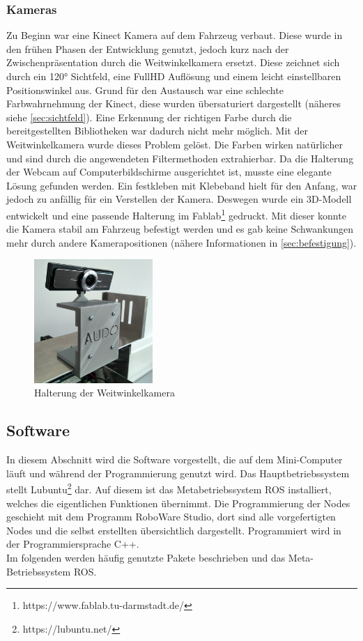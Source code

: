 \subsubsection{Kameras}
\label{sec:kameras}
Zu Beginn war eine Kinect Kamera auf dem Fahrzeug verbaut. Diese wurde in den frühen Phasen der Entwicklung genutzt, jedoch kurz nach der Zwischenpräsentation durch die Weitwinkelkamera ersetzt. Diese zeichnet sich durch ein 120° Sichtfeld, eine FullHD Auflösung und einem leicht einstellbaren Positionswinkel aus.
Grund für den Austausch war eine schlechte Farbwahrnehmung der Kinect, diese wurden übersaturiert dargestellt (näheres siehe \autoref{sec:sichtfeld}). Eine Erkennung der richtigen Farbe durch die bereitgestellten Bibliotheken war dadurch nicht mehr möglich. 
Mit der Weitwinkelkamera wurde dieses Problem gelöst. Die Farben wirken natürlicher und sind durch die angewendeten Filtermethoden extrahierbar. Da die Halterung der Webcam auf Computerbildschirme ausgerichtet ist, musste eine elegante Lösung gefunden werden. Ein festkleben mit Klebeband hielt für den Anfang, war jedoch zu anfällig für ein Verstellen der Kamera.
Deswegen  wurde ein 3D-Modell entwickelt und eine passende Halterung im Fablab\footnote{https://www.fablab.tu-darmstadt.de/} gedruckt. Mit dieser konnte die Kamera stabil am Fahrzeug befestigt werden und es gab keine Schwankungen mehr durch andere Kamerapositionen (nähere Informationen in \autoref{sec:befestigung}). 
\begin{figure}
	\centering
	\includegraphics[width=0.4\textwidth]{images/Foto_Halterung.jpg}
	\caption{Halterung der Weitwinkelkamera}
	\label{abb:halterung}
\end{figure}
\subsection{Software}
\label{sec:software}
In diesem Abschnitt wird die Software vorgestellt, die auf dem Mini-Computer läuft und während der Programmierung genutzt wird. Das Hauptbetriebssystem stellt Lubuntu\footnote{https://lubuntu.net/} dar. Auf diesem ist das Metabetriebssystem ROS installiert, welches die eigentlichen Funktionen übernimmt. Die Programmierung der Nodes geschieht mit dem Programm RoboWare Studio, dort sind alle vorgefertigten Nodes und die selbst erstellten  übersichtlich dargestellt. Programmiert wird in der Programmiersprache C++. \\
Im folgenden werden häufig genutzte Pakete beschrieben und das Meta-Betriebssystem ROS.

